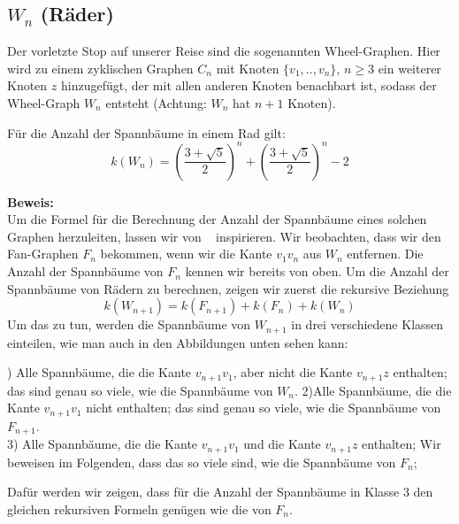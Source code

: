 \subsection{$W_n$ (Räder)}
Der vorletzte Stop auf unserer Reise sind die sogenannten Wheel-Graphen. Hier wird zu einem zyklischen Graphen $C_n$ mit Knoten $\{v_1,..,v_n\}$, $n \geq 3$ ein weiterer Knoten $z$ hinzugefügt, der mit allen anderen Knoten benachbart ist, sodass der Wheel-Graph $W_{n}$ entsteht (Achtung: $W_n$ hat $n+1$ Knoten).
\begin{Tm}
Für die Anzahl der Spannbäume in einem Rad gilt:
\begin{equation}
 \mathit{k}(W_n) = (\frac{3+\sqrt{5}}{2})^n+(\frac{3+\sqrt{5}}{2})^n-2
 \label{wn}
\end{equation}
\end{Tm}
\textbf{Beweis:}\\
Um die Formel für die Berechnung der Anzahl der Spannbäume eines solchen Graphen herzuleiten, lassen wir von ~\cite{sedlacek_1970} inspirieren.
Wir beobachten, dass wir den Fan-Graphen $F_n$ bekommen, wenn wir die Kante $v_1v_n$ aus $W_n$ entfernen.
Die Anzahl der Spannbäume von $F_n$ kennen wir bereits von oben.
Um die Anzahl der Spannbäume von Rädern zu berechnen, zeigen wir zuerst die rekursive Beziehung
\begin{equation}
 \mathit{k}(W_{n+1}) = \mathit{k}(F_{n+1}) + \mathit{k}(F_n) + \mathit{k}(W_n)
\end{equation}
Um das zu tun, werden die Spannbäume von $W_{n+1}$ in drei verschiedene Klassen einteilen, wie man auch in den Abbildungen unten sehen kann:\\
\par %
\begingroup
\leftskip=20pt%
\rightskip=20pt
) Alle Spannbäume, die die Kante $v_{n+1}v_1$, aber nicht die Kante $v_{n+1}z$ enthalten; das sind genau so viele, wie die Spannbäume von $W_n$.
2)Alle Spannbäume, die die Kante $v_{n+1}v_1$ nicht enthalten; das sind genau so viele, wie die Spannbäume von $F_{n+1}$.\\
3) Alle Spannbäume, die die Kante $v_{n+1}v_1$ und die Kante $v_{n+1}z$ enthalten; Wir beweisen im Folgenden, dass das so viele sind, wie die Spannbäume von $F_n$;
\par
\endgroup
Dafür werden wir zeigen, dass für die Anzahl der Spannbäume in Klasse 3 den gleichen rekursiven Formeln genügen wie die von $F_n$.\\
